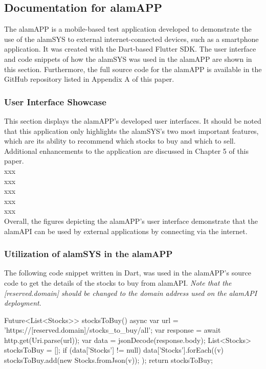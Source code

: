 \subsection{Documentation for alamAPP}
\label{subsec:doc_alamAPP}
The alamAPP is a mobile-based test application developed to 
demonstrate the use of the alamSYS to external internet-connected 
devices, such as a smartphone application. It was created with the 
Dart-based Flutter SDK. The user interface and code snippets of how 
the alamSYS was used in the alamAPP are shown in this section. 
Furthermore, the full source code for the alamAPP is available 
in the GitHub repository listed in Appendix A of this paper.

\subsubsection{User Interface Showcase}
\label{subsubsec:alamAPP_UI}
This section displays the alamAPP's developed user interfaces. 
It should be noted that this application only highlights the 
alamSYS's two most important features, which are its ability 
to recommend which stocks to buy and which to sell. Additional 
enhancements to the application are discussed in Chapter 5 of 
this paper.
\\

xxx
\\

xxx
\\

xxx
\\

xxx
\\

xxx
\\

Overall, the figures depicting the alamAPP's user interface 
demonstrate that the alamAPI can be used by external applications 
by connecting via the internet.

\subsubsection{Utilization of alamSYS in the alamAPP}
\label{subsubsec:utilization_alamSYS-alamAPP}
The following code snippet written in Dart, was used in the alamAPP's source 
code to get the details of the stocks to buy from alamAPI.
\textit{Note that the [reserved.domain] should be changed to
the domain address used on the alamAPI deployment}.
\hfill \\
\begin{python}
    Future<List<Stocks>> stocksToBuy() async {
        var url = 'https://[reserved.domain]/stocks_to_buy/all';
        var response = await http.get(Uri.parse(url));
        var data = jsonDecode(response.body);
        List<Stocks> stocksToBuy = [];
        if (data['Stocks'] != null) {
        data['Stocks'].forEach((v) {
            stocksToBuy.add(new Stocks.fromJson(v));
          });
        }
        return stocksToBuy;
    }
\end{python}


